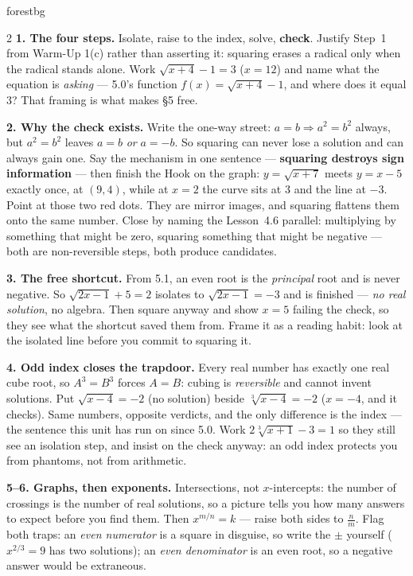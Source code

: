 \documentclass[10pt]{article}
\begin{document}
\begin{skillbox}[Lesson]{forestbg}
\begin{multicols}{2}
\textbf{1. The four steps.} Isolate, raise to the index, solve, \textbf{check}. Justify Step~1 from
Warm-Up 1(c) rather than asserting it: squaring erases a radical only when the radical stands alone.
Work $\sqrt{x+4}-1=3$ ($x=12$) and name what the equation is \emph{asking} --- 5.0's function
$f(x)=\sqrt{x+4}-1$, and where does it equal $3$? That framing is what makes \S5 free.

\textbf{2. Why the check exists.} Write the one-way street: $a=b \Rightarrow a^{2}=b^{2}$ always,
but $a^{2}=b^{2}$ leaves $a=b$ \emph{or} $a=-b$. So squaring can never lose a solution and can
always gain one. Say the mechanism in one sentence --- \textbf{squaring destroys sign
information} --- then finish the Hook on the graph: $y=\sqrt{x+7}$ meets $y=x-5$ exactly once, at
$(9,4)$, while at $x=2$ the curve sits at $3$ and the line at $-3$. Point at those two red dots.
They are mirror images, and squaring flattens them onto the same number. Close by naming the
Lesson~4.6 parallel: multiplying by something that might be zero, squaring something that might be
negative --- both are non-reversible steps, both produce candidates.

\columnbreak

\textbf{3. The free shortcut.} From 5.1, an even root is the \emph{principal} root and is never
negative. So $\sqrt{2x-1}+5=2$ isolates to $\sqrt{2x-1}=-3$ and is finished --- \emph{no real
solution}, no algebra. Then square anyway and show $x=5$ failing the check, so they see what the
shortcut saved them from. Frame it as a reading habit: look at the isolated line before you commit
to squaring it.

\textbf{4. Odd index closes the trapdoor.} Every real number has exactly one real cube root, so
$A^{3}=B^{3}$ forces $A=B$: cubing is \emph{reversible} and cannot invent solutions. Put
$\sqrt{x-4}=-2$ (no solution) beside $\sqrt[3]{x-4}=-2$ ($x=-4$, and it checks). Same numbers,
opposite verdicts, and the only difference is the index --- the sentence this unit has run on since
5.0. Work $2\sqrt[3]{x+1}-3=1$ so they still see an isolation step, and insist on the check anyway:
an odd index protects you from phantoms, not from arithmetic.

\textbf{5--6. Graphs, then exponents.} Intersections, not $x$-intercepts: the number of crossings is
the number of real solutions, so a picture tells you how many answers to expect before you find
them. Then $x^{m/n}=k$ --- raise both sides to $\frac{n}{m}$. Flag both traps: an \emph{even
numerator} is a square in disguise, so write the $\pm$ yourself ($x^{2/3}=9$ has two solutions); an
\emph{even denominator} is an even root, so a negative answer would be extraneous.
\end{multicols}
\end{skillbox}
\end{document}
